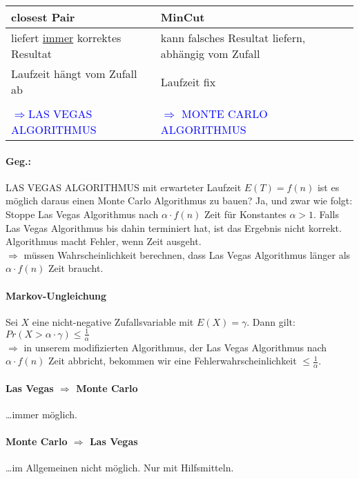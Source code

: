 \begin{table}
\centering
\begin{tabular}{l|l}
closest Pair & MinCut \\
\hline
\hline
liefert \underline{immer} korrektes Resultat & kann falsches Resultat liefern, abhängig vom Zufall \\
\hline
Laufzeit hängt vom Zufall ab & Laufzeit fix \\
& \\
\textcolor{blue}{$\Rightarrow$LAS VEGAS ALGORITHMUS} & \textcolor{blue}{$\Rightarrow$ MONTE CARLO ALGORITHMUS} \\
\end{tabular}
\end{table}

\paragraph*{Geg.:} LAS VEGAS ALGORITHMUS mit erwarteter Laufzeit $E(T) = f(n)$ ist es möglich daraus einen Monte Carlo Algorithmus zu bauen? Ja, und zwar wie folgt:
\minisec{} Stoppe Las Vegas Algorithmus nach $\alpha \cdot f(n)$ Zeit für Konstantes $\alpha > 1$. Falls Las Vegas Algorithmus bis dahin terminiert hat, ist das Ergebnis nicht korrekt. Algorithmus macht Fehler, wenn Zeit ausgeht. \\
$\Rightarrow$ müssen Wahrscheinlichkeit berechnen, dass Las Vegas Algorithmus länger als $\alpha \cdot f(n)$ Zeit braucht.

\paragraph*{Markov-Ungleichung} Sei $X$ eine nicht-negative Zufallsvariable mit $E(X) = \gamma$.
Dann gilt: $Pr(X > \alpha \cdot \gamma) \leq \frac{1}{\alpha}$ \\
$\Rightarrow$ in unserem modifizierten Algorithmus, der Las Vegas Algorithmus nach $\alpha \cdot f(n)$ Zeit abbricht, bekommen wir eine Fehlerwahrscheinlichkeit $\leq \frac{1}{\alpha}$.

\paragraph*{Las Vegas $\Rightarrow$ Monte Carlo} \dots immer möglich.
\paragraph*{Monte Carlo $\Rightarrow$ Las Vegas} \dots im Allgemeinen nicht möglich. Nur mit Hilfsmitteln.
